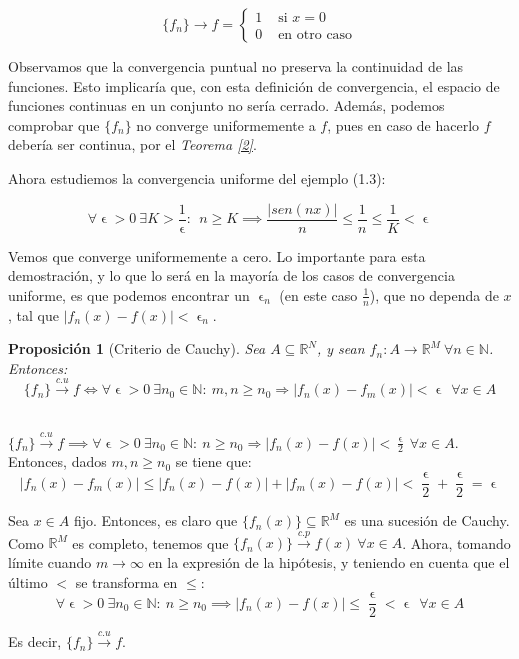 \documentclass[11pt, a4paper]{article}
\makeatletter
\newif\IfInSansMode
\let\oldsf\sffamily
\renewcommand*{\sffamily}{\oldsf\mathversion{sans}\InSansModetrue}
\let\oldnorm\normalfont
\renewcommand*{\normalfont}{\oldnorm\InSansModefalse\mathversion{normal}}
\let\epsilon\upvarepsilon
\providecommand{\abs}[1]{\lvert#1\rvert}
\newcommand{\fn}{\{f_n\}}
\renewenvironment{proof}[1][\proofname] {\par\pushQED{\qed}\normalfont\topsep6\p@\@plus6\p@\relax\trivlist\item[\hskip\labelsep\itshape\sffamily#1\@addpunct{.}]\ignorespaces}{\popQED\endtrivlist\@endpefalse}
\theoremstyle{theorem-style}
\newtheorem{nprop}{Proposición}[section]
\theoremstyle{definition-style}
\theoremstyle{remark-style}
\theoremstyle{example-style}
\makeatother
\begin{document}
\[
  \fn\to f = \begin{cases}
    1 & \text{ si } x=0\\
    0 & \text{ en otro caso}
  \end{cases}
\]

Observamos que la convergencia puntual no preserva la continuidad de las funciones. Esto implicaría que, con esta definición de convergencia, el espacio de funciones continuas en un conjunto no sería cerrado. Además, podemos comprobar que $\fn$ no converge uniformemente a $f$, pues en caso de hacerlo $f$ debería ser continua, por el \textit{Teorema \ref{2}}.

Ahora estudiemos la convergencia uniforme del ejemplo (1.3):

\[
  \forall\epsilon>0\ \exists K>\dfrac{1}{\epsilon}:\ \ n\ge K \implies \dfrac{\abs{sen(nx)}}{n} \le \dfrac{1}{n} \le \dfrac{1}{K} < \epsilon
\]

Vemos que converge uniformemente a cero. Lo importante para esta demostración, y lo que lo será en la mayoría de los casos de convergencia uniforme, es que podemos encontrar un $\epsilon_n$ (en este caso $\frac{1}{n}$), que no dependa de $x$, tal que $\abs{f_n(x)-f(x)} < \epsilon_n$.

\begin{nprop}[Criterio de Cauchy]
  Sea $A \subseteq \mathbb{R}^N$, y sean $f_n: A \longrightarrow \mathbb{R}^M \ \forall n \in \mathbb{N}$. Entonces: $$\fn \xrightarrow {c.u} f \iff \forall \epsilon > 0\ \exists n_0 \in \mathbb{N}:\ m,n \ge n_0 \Rightarrow |f_n(x) - f_m(x)| < \epsilon\ \ \forall x \in A$$
\end{nprop}

  \begin{proof} \hfill \\
    \boxed{\Rightarrow}	 $\fn \xrightarrow {c.u} f \implies \forall \epsilon > 0\ \exists n_0 \in \mathbb{N}:\ n \ge n_0 \Rightarrow |f_n(x) - f(x)| < \frac{\epsilon}{2}\ \forall x \in A$. Entonces, dados $m,n \ge n_0$ se tiene que: 
    $$ |f_n(x) - f_m(x)| \le |f_n(x) - f(x)| + |f_m(x) - f(x)| < \frac{\epsilon}{2} + \frac{\epsilon}{2} = \epsilon$$

    \boxed{\Leftarrow} Sea $x \in A$ fijo. Entonces, es claro que $\{f_n(x)\} \subseteq \mathbb{R}^M$ es una sucesión de Cauchy. Como $\mathbb{R}^M$ es completo, tenemos que $\{f_n(x)\} \xrightarrow {c.p} f(x)\ \forall x \in A$. Ahora, tomando límite cuando $m \to \infty$ en la expresión de la hipótesis, y teniendo en cuenta que el último $<$ se transforma en $\le$: $$\forall \epsilon > 0\ \exists n_0 \in \mathbb{N}:\ n \ge n_0 \implies |f_n(x) - f(x)| \le \frac{\epsilon}{2} < \epsilon\ \ \forall x \in A$$

    Es decir, $\fn \xrightarrow {c.u} f$.
  \end{proof}
\end{document}
